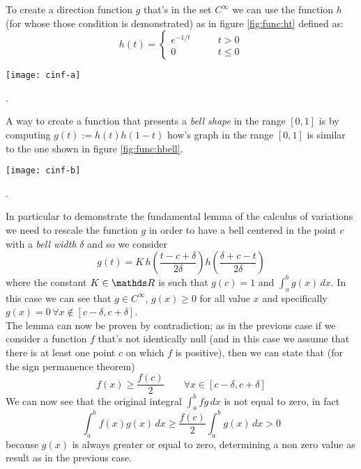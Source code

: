 	To create a direction function $g$ that's in the set $C^\infty$ we can use the function $h$(for whose those condition is demonstrated) as in figure \ref{fig:func:ht} defined as:
	\begin{equation} \label{eq:func:ht}
		h(t) = \begin{cases}
			e^{-1/t} \qquad & t > 0 \\ 
			0 & t\leq 0
		\end{cases}
	\end{equation}
	\begin{SCfigure}[2][b]
		\centering \texttt{[image: cinf-a]}
		\caption{representation of $h(t)$ defined in equation \ref{eq:func:ht}}.
		\label{fig:func:ht}
	\end{SCfigure}

	A way to create a function that presents a \textit{bell shape} in the range $[0,1]$ is by computing $g(t) := h(t) h(1-t)$ how's graph in the range $[0,1]$ is similar to the one shown in figure \ref{fig:func:hbell}.
	
	\begin{SCfigure}[2][bht]
		\centering \texttt{[image: cinf-b]}
		\caption{representation of the function $g(t):=h(t)h(1-t)$, where $h(t)$ is defined in equation \ref{eq:func:ht}}.
		\label{fig:func:hbell}
	\end{SCfigure}
	
	In particular to demonstrate the fundamental lemma of the calculus of variations we need to rescale the function $g$ in order to have a bell centered in the point $c$ with a \textit{bell width} $\delta$ and so we consider
	\[ g(t) = K \, h\left(\frac{t-c+\delta}{2 \delta}\right) h\left( \frac{\delta + c - t}{2 \delta} \right) \] 
	where the constant $K\in\R$ is such that $g(c)=1$ and $\int_a^bg(x)\, dx$. In this case we can see that $g\in C^\infty$, $g(x) \geq 0 $ for all value $x$ and specifically $g(x) = 0 \, \forall x\notin[c-\delta,c+\delta]$.\\
	The lemma can now be proven by contradiction; as in the previous case if we consider a function $f$ that's not identically null (and in this case we assume that there is at least one point $c$ on which $f$ is positive), then we can state that (for the sign permanence theorem)
	\[ f(x) \geq \frac{f(c)}{2} \qquad \forall x \in [c-\delta,c+\delta] \] 
	We can now see that the original integral $\int_a^b fg\, dx$ is not equal to zero, in fact
	\[ \int_a^b f(x)g(x)\, dx \geq \frac{f(c)}{2}\int_a^bg(x)\, dx > 0 \]
	because $g(x)$ is always greater or equal to zero, determining a non zero value as result as in the previous case.
	
